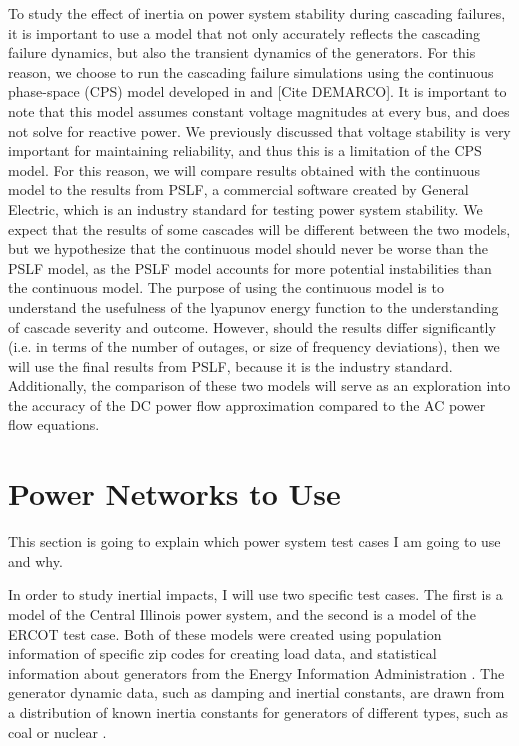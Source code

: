 To study the effect of inertia on power system stability during cascading failures, it is important to use a model that not only accurately reflects the cascading failure dynamics, but also the transient dynamics of the generators.  For this reason, we choose to run the cascading failure simulations using the continuous phase-space (CPS) model developed in \cite{Yang2017} and [Cite DEMARCO].  It is important to note that this model assumes constant voltage magnitudes at every bus, and does not solve for reactive power.  We previously discussed that voltage stability is very important for maintaining reliability, and thus this is a limitation of the CPS model.  For this reason, we will compare results obtained with the continuous model to the results from PSLF, a commercial software created by General Electric, which is an industry standard for testing power system stability.  We expect that the results of some cascades will be different between the two models, but we hypothesize that the continuous model should never be worse than the PSLF model, as the PSLF model accounts for more potential instabilities than the continuous model.  The purpose of using the continuous model is to understand the usefulness of the lyapunov energy function to the understanding of cascade severity and outcome.  However, should the results differ significantly (i.e. in terms of the number of outages, or size of frequency deviations), then we will use the final results from PSLF, because it is the industry standard. Additionally, the comparison of these two models will serve as an exploration into the accuracy of the DC power flow approximation compared to the AC power flow equations.  

\section{Power Networks to Use}

This section is going to explain which power system test cases I am going to use and why.

In order to study inertial impacts, I will use two specific test cases.  The first is a model of the Central Illinois power system, and the second is a model of the ERCOT test case.  Both of these models were created using population information of specific zip codes for creating load data, and statistical information about generators from the Energy Information Administration \cite{Birchfield2017}.  The generator dynamic data, such as damping and inertial constants, are drawn from a distribution of known inertia constants for generators of different types, such as coal or nuclear \cite{Xu2017}. 




